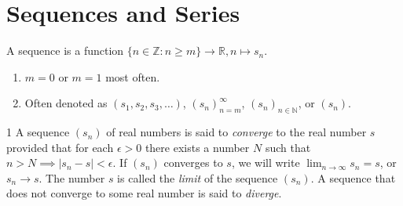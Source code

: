 \section{Sequences and Series}

\begin{defn}{1}
	A sequence is a function $\{n\in\mathbb{Z}:n\geq m\} \rightarrow \mathbb{R},n\mapsto s_n$.
	\begin{enumerate}
		\item $m=0$ or $m=1$ most often.
		\item Often denoted as $(s_1,s_2,s_3,\dots)$, $(s_n)_{n=m}^\infty$, $(s_n)_{n\in\mathbb{N}}$, or $(s_n)$.		
	\end{enumerate}
\end{defn}

\begin{defn}{1}
	A sequence $(s_n)$ of real numbers is said to \textit{converge} to the real number $s$ provided that for each $\epsilon > 0$ there exists a number $N$	such that $n > N \implies |s_n-s|<\epsilon$. If $(s_n)$ converges to $s$, we will write $\lim_{n\rightarrow\infty} s_n = s$, or $s_n \rightarrow s$. The	number $s$ is called the \textit{limit} of the sequence $(s_n)$. A sequence that does not converge to some real number is said to \textit{diverge}.
\end{defn}

\newpage

